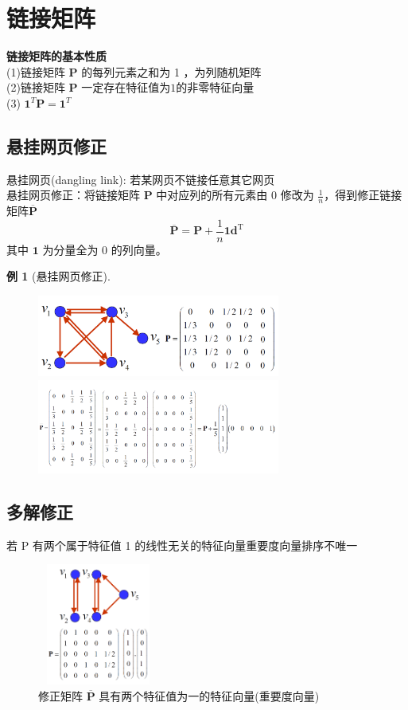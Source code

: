 \documentclass[10t, a4paper, oneside]{ctexbook}
\newtheorem{example}[theorem]{例}
\begin{document}
\section{链接矩阵}
\noindent\textbf{链接矩阵的基本性质}\\
(1)链接矩阵 $\mathbf{P}$ 的每列元素之和为 1 ，为列随机矩阵\\
(2)链接矩阵 $\mathbf{P}$ 一定存在特征值为$1$的非零特征向量\\
(3)  $\mathbf{1}^T \mathbf{P} = \mathbf{1}^T$

\subsection{悬挂网页修正}
\noindent 悬挂网页(dangling link): 若某网页不链接任意其它网页\\
悬挂网页修正：将链接矩阵 $\mathbf{P}$ 中对应列的所有元素由 $0$ 修改为 $\frac{1}{n}$，得到修正链接矩阵$\overline{\mathbf{P}}$\\
$$\overline{\mathbf{P}}=\mathbf{P}+\frac1n\mathbf{1}\mathbf{d}^\mathrm{T}$$
其中 $\mathbf{1}$ 为分量全为 $0$ 的列向量。
\begin{example}[悬挂网页修正]
    \begin{figure}[H]
        \centering
        \includegraphics[width = 8cm]{assets/修正矩阵-原矩阵.png}
        \includegraphics[width=8cm]{assets/修正矩阵-修正后矩阵.png}       
    \end{figure}
\end{example}
\subsection{多解修正}
若 P 有两个属于特征值 1 的线性无关的特征向量重要度向量排序不唯一\\
\begin{figure}[H]
    \centering
    \includegraphics[width = 4cm,height = 4cm]{assets/两个特征向量的修正矩阵.png}
    \caption{修正矩阵 $\overline{\mathbf{P}}$ 具有两个特征值为一的特征向量(重要度向量)}  
\end{figure}
\end{document}
